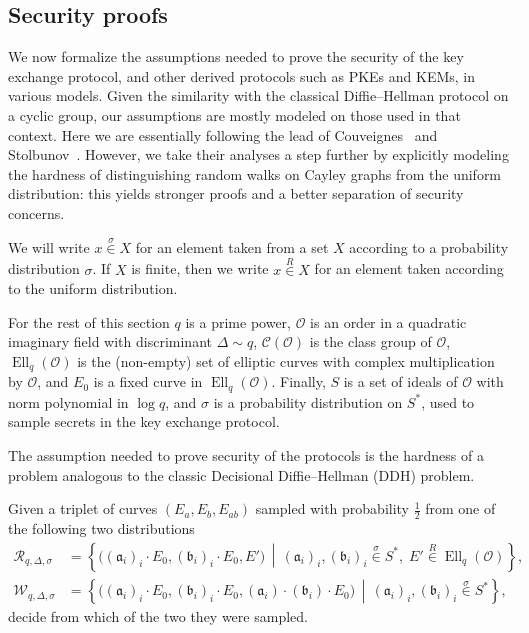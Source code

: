\documentclass{llncs}
\newcommand{\Cl}{\mathcal{C}}
\renewcommand{\O}{\mathcal{O}}
\newcommand{\suchthat}{\,\middle\vert\,}
\renewcommand{\frak}{\mathfrak}
\newcommand{\rand}[1]{\overset{#1}{∈}}
\newcommand{\uni}{\rand{R}}
\DeclareMathOperator{\Ell}{Ell}
\begin{document}
\subsection{Security proofs}
\label{sec:proofs}

We now formalize the assumptions needed to prove the security of the
key exchange protocol, and other derived protocols such as PKEs and
KEMs, in various models. Given the similarity with the classical
Diffie--Hellman protocol on a cyclic group, our assumptions are
mostly modeled on those used in that context. Here we are
essentially following the lead of
Couveignes~\cite{cryptoeprint:2006:291} and
Stolbunov~\cite{Stol,Stolbunov2012}.
However, we take their analyses a
step further by explicitly modeling the hardness of distinguishing
random walks on Cayley graphs from the uniform distribution: this
yields stronger proofs and a better separation of security concerns.

We will write $x\rand{σ} X$ for an element taken from a set $X$
according to a probability distribution $σ$. If $X$ is finite,
then we write $x\uni X$ for an element taken according to the uniform
distribution.

For the rest of this section $q$ is a prime power, $\O$ is an order in
a quadratic imaginary field with discriminant $Δ\sim q$, $\Cl(\O)$ is
the class group of $\O$, $\Ell_q(\O)$ is the (non-empty) set of
elliptic curves with complex multiplication by $\O$, and $E_0$ is a
fixed curve in $\Ell_q(\O)$. Finally, $S$ is a set of ideals of $\O$
with norm polynomial in $\log q$, and $σ$ is a probability
distribution on $S^*$, used to sample secrets in the key exchange
protocol.

The assumption needed to prove security of the protocols is 
the hardness of a problem analogous to 
the classic Decisional Diffie--Hellman (DDH) problem.

\begin{definition}
    Given a triplet of curves $(E_a,E_b,E_{ab})$
    sampled with probability $\frac{1}{2}$ 
    from one of the following two distributions
  \begin{align*}
    \mathcal{R}_{q,Δ,σ} &= \left\{\bigl((\frak a_i)_i·E_0,(\frak b_i)_i·E_0,E'\bigr) \suchthat
                        (\frak a_i)_i,(\frak b_i)_i\rand{σ}S^*,\;
                        E'\uni\Ell_q(\O)\right\},\\
    \mathcal{W}_{q,Δ,σ} &= \left\{\bigl((\frak a_i)_i·E_0,(\frak b_i)_i·E_0,(\frak a_i)·(\frak b_i)·E_0\bigr) \suchthat
                          (\frak a_i)_i,(\frak b_i)_i\rand{σ}S^*\right\},
  \end{align*}
  decide from which of the two they were sampled.
\end{definition}
\end{document}
